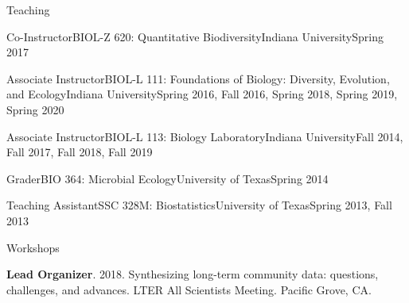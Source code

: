 \documentclass{resume} %
\begin{document}
\bigskip

\begin{rSection}{Teaching}

\begin{Course}
  {Co-Instructor}{BIOL-Z 620: Quantitative Biodiversity}{Indiana University}{Spring 2017}
\end{Course}

\begin{Course}
  {Associate Instructor}{BIOL-L 111: Foundations of Biology: Diversity, Evolution, and Ecology}{Indiana University}{Spring 2016, Fall 2016, Spring 2018, Spring 2019, Spring 2020}
\end{Course}

\begin{Course}
  {Associate Instructor}{BIOL-L 113: Biology Laboratory}{Indiana University}{Fall 2014, Fall 2017, Fall 2018, Fall 2019}
\end{Course}

\begin{Course}
  {Grader}{BIO 364: Microbial Ecology}{University of Texas}{Spring 2014}
\end{Course}

\begin{Course}
  {Teaching Assistant}{SSC 328M: Biostatistics}{University of Texas}{Spring 2013, Fall 2013}
\end{Course}

\end{rSection}

\bigskip


\begin{rSection}{Workshops}

{\bf Lead Organizer}. 2018. Synthesizing long-term community data: questions, challenges, and advances. LTER All Scientists Meeting. Pacific Grove, CA.

\end{rSection}
\bigskip
\end{document}
